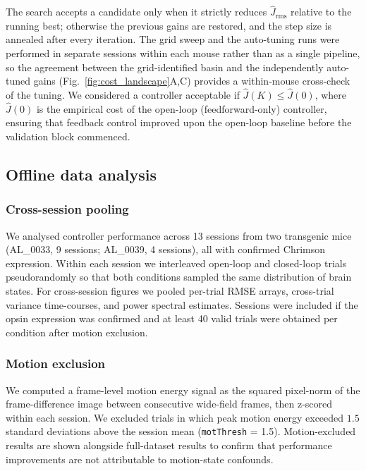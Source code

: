 The search accepts a candidate only when it strictly reduces
$\hat{J}_{\mathrm{rms}}$ relative to the running best; otherwise the
previous gains are restored, and the step size is annealed after every
iteration. The grid sweep and the auto-tuning runs were performed in
separate sessions within each mouse rather than as a single pipeline, so
the agreement between the grid-identified basin and the independently
auto-tuned gains (Fig.~\ref{fig:cost_landscape}A,C) provides a
within-mouse cross-check of the tuning. We considered a controller
acceptable if $\hat{J}(K) \leq \hat{J}(0)$, where $\hat{J}(0)$ is the
empirical cost of the open-loop (feedforward-only) controller, ensuring
that feedback control improved upon the open-loop baseline before the
validation block commenced.

\subsection*{Offline data analysis}

\subsubsection*{Cross-session pooling}

We analysed controller performance across 13 sessions from two transgenic mice (AL\_0033, 9 sessions; AL\_0039, 4 sessions), all with confirmed Chrimson expression. Within each session
we interleaved open-loop and closed-loop trials pseudorandomly so that
both conditions sampled the same distribution of brain states. For
cross-session figures we pooled per-trial RMSE arrays, cross-trial
variance time-courses, and power spectral estimates. Sessions were
included if the opsin expression was confirmed and at least 40 valid
trials were obtained per condition after motion exclusion.

\subsubsection*{Motion exclusion}

We computed a frame-level motion energy signal as the squared pixel-norm
of the frame-difference image between consecutive wide-field frames, then
z-scored within each session. We excluded trials in which peak motion
energy exceeded $1.5$ standard deviations above the session mean
(\texttt{motThresh} = 1.5). Motion-excluded results are shown alongside
full-dataset results to confirm that performance improvements are not
attributable to motion-state confounds.


